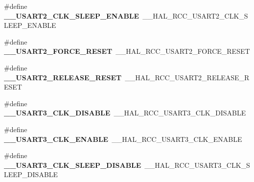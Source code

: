 \begin{DoxyCompactItemize}
\item 
\#define {\bfseries \+\_\+\+\_\+\+U\+S\+A\+R\+T2\+\_\+\+C\+L\+K\+\_\+\+S\+L\+E\+E\+P\+\_\+\+E\+N\+A\+B\+LE}~\+\_\+\+\_\+\+H\+A\+L\+\_\+\+R\+C\+C\+\_\+\+U\+S\+A\+R\+T2\+\_\+\+C\+L\+K\+\_\+\+S\+L\+E\+E\+P\+\_\+\+E\+N\+A\+B\+LE\hypertarget{group___h_a_l___r_c_c___aliased_gad7970d225de9a77f3fc745293ca316ed}{}\label{group___h_a_l___r_c_c___aliased_gad7970d225de9a77f3fc745293ca316ed}

\item 
\#define {\bfseries \+\_\+\+\_\+\+U\+S\+A\+R\+T2\+\_\+\+F\+O\+R\+C\+E\+\_\+\+R\+E\+S\+ET}~\+\_\+\+\_\+\+H\+A\+L\+\_\+\+R\+C\+C\+\_\+\+U\+S\+A\+R\+T2\+\_\+\+F\+O\+R\+C\+E\+\_\+\+R\+E\+S\+ET\hypertarget{group___h_a_l___r_c_c___aliased_ga979c0d058e16fdea1923807ab635f4dd}{}\label{group___h_a_l___r_c_c___aliased_ga979c0d058e16fdea1923807ab635f4dd}

\item 
\#define {\bfseries \+\_\+\+\_\+\+U\+S\+A\+R\+T2\+\_\+\+R\+E\+L\+E\+A\+S\+E\+\_\+\+R\+E\+S\+ET}~\+\_\+\+\_\+\+H\+A\+L\+\_\+\+R\+C\+C\+\_\+\+U\+S\+A\+R\+T2\+\_\+\+R\+E\+L\+E\+A\+S\+E\+\_\+\+R\+E\+S\+ET\hypertarget{group___h_a_l___r_c_c___aliased_ga0b8442b95cc856fb66c66874d511c5bb}{}\label{group___h_a_l___r_c_c___aliased_ga0b8442b95cc856fb66c66874d511c5bb}

\item 
\#define {\bfseries \+\_\+\+\_\+\+U\+S\+A\+R\+T3\+\_\+\+C\+L\+K\+\_\+\+D\+I\+S\+A\+B\+LE}~\+\_\+\+\_\+\+H\+A\+L\+\_\+\+R\+C\+C\+\_\+\+U\+S\+A\+R\+T3\+\_\+\+C\+L\+K\+\_\+\+D\+I\+S\+A\+B\+LE\hypertarget{group___h_a_l___r_c_c___aliased_ga5493319829b9739c7495cc765162f4b3}{}\label{group___h_a_l___r_c_c___aliased_ga5493319829b9739c7495cc765162f4b3}

\item 
\#define {\bfseries \+\_\+\+\_\+\+U\+S\+A\+R\+T3\+\_\+\+C\+L\+K\+\_\+\+E\+N\+A\+B\+LE}~\+\_\+\+\_\+\+H\+A\+L\+\_\+\+R\+C\+C\+\_\+\+U\+S\+A\+R\+T3\+\_\+\+C\+L\+K\+\_\+\+E\+N\+A\+B\+LE\hypertarget{group___h_a_l___r_c_c___aliased_ga821236fc8d13c8b707128514c0a42a02}{}\label{group___h_a_l___r_c_c___aliased_ga821236fc8d13c8b707128514c0a42a02}

\item 
\#define {\bfseries \+\_\+\+\_\+\+U\+S\+A\+R\+T3\+\_\+\+C\+L\+K\+\_\+\+S\+L\+E\+E\+P\+\_\+\+D\+I\+S\+A\+B\+LE}~\+\_\+\+\_\+\+H\+A\+L\+\_\+\+R\+C\+C\+\_\+\+U\+S\+A\+R\+T3\+\_\+\+C\+L\+K\+\_\+\+S\+L\+E\+E\+P\+\_\+\+D\+I\+S\+A\+B\+LE\hypertarget{group___h_a_l___r_c_c___aliased_ga32b28245d8d5a75b7182779315cb74d8}{}\label{group___h_a_l___r_c_c___aliased_ga32b28245d8d5a75b7182779315cb74d8}


\end{DoxyCompactItemize}
